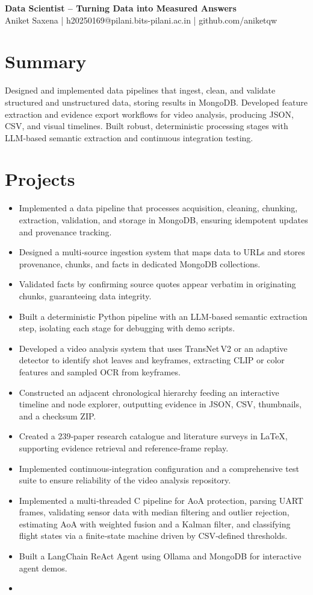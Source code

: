 \documentclass[11pt,a4paper]{article}
\begin{document}
\begin{center}{\LARGE\bfseries Data Scientist – Turning Data into Measured Answers}\\[4pt]
Aniket Saxena | h20250169@pilani.bits-pilani.ac.in | github.com/aniketqw\end{center}

\section*{Summary}
Designed and implemented data pipelines that ingest, clean, and validate structured and unstructured data, storing results in MongoDB. Developed feature extraction and evidence export workflows for video analysis, producing JSON, CSV, and visual timelines. Built robust, deterministic processing stages with LLM‑based semantic extraction and continuous integration testing.

\section*{Projects}
\begin{itemize}
  \item Implemented a data pipeline that processes acquisition, cleaning, chunking, extraction, validation, and storage in MongoDB, ensuring idempotent updates and provenance tracking.
  \item Designed a multi‑source ingestion system that maps data to URLs and stores provenance, chunks, and facts in dedicated MongoDB collections.
  \item Validated facts by confirming source quotes appear verbatim in originating chunks, guaranteeing data integrity.
  \item Built a deterministic Python pipeline with an LLM‑based semantic extraction step, isolating each stage for debugging with demo scripts.
  \item Developed a video analysis system that uses TransNet V2 or an adaptive detector to identify shot leaves and keyframes, extracting CLIP or color features and sampled OCR from keyframes.
  \item Constructed an adjacent chronological hierarchy feeding an interactive timeline and node explorer, outputting evidence in JSON, CSV, thumbnails, and a checksum ZIP.
  \item Created a 239‑paper research catalogue and literature surveys in LaTeX, supporting evidence retrieval and reference‑frame replay.
  \item Implemented continuous‑integration configuration and a comprehensive test suite to ensure reliability of the video analysis repository.
  \item Implemented a multi‑threaded C pipeline for AoA protection, parsing UART frames, validating sensor data with median filtering and outlier rejection, estimating AoA with weighted fusion and a Kalman filter, and classifying flight states via a finite‑state machine driven by CSV‑defined thresholds.
  \item Built a LangChain ReAct Agent using Ollama and MongoDB for interactive agent demos.
  \item 
\end{itemize}
\end{document}
